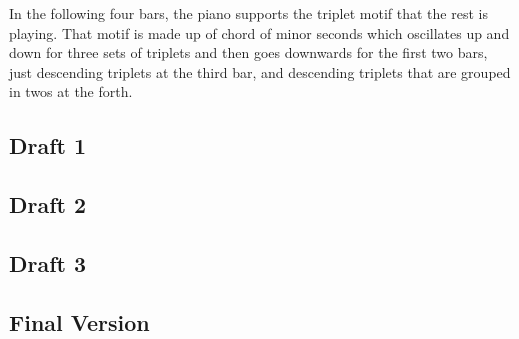 \documentclass{article}
\begin{document}
In the following four bars, the piano supports the triplet motif that the rest is
playing. That motif is made up of chord of minor seconds which oscillates up
and down for three sets of triplets and then goes downwards for the first two
bars, just descending triplets at the third bar, and descending triplets that
are grouped in twos at the forth.\\

\newpage
\begin{center}
\vspace*{\fill}
\LARGE
\subsection{Draft 1}
\vspace*{\fill}
%
\end{center}
\newpage
\begin{center}
\vspace*{\fill}
\LARGE
\subsection{Draft 2}
\vspace*{\fill}
%
\end{center}
\newpage
\begin{center}
\vspace*{\fill}
\LARGE
\subsection{Draft 3}
\vspace*{\fill}
%
\end{center}
\newpage
\begin{center}
\vspace*{\fill}
\LARGE
\subsection{Final Version}
\vspace*{\fill}
%
\end{center}

\end{document}
